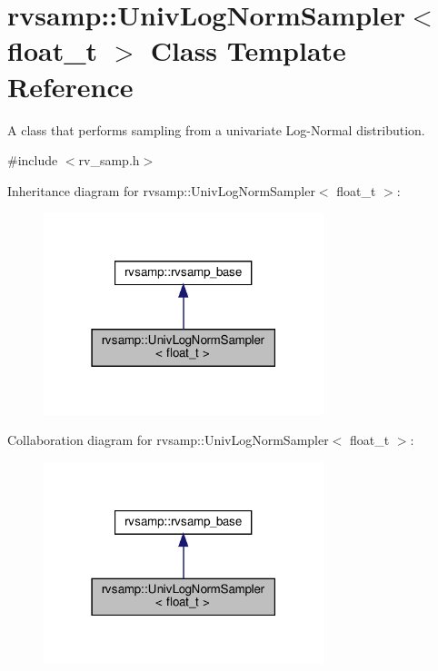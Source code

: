 \hypertarget{classrvsamp_1_1UnivLogNormSampler}{}\section{rvsamp\+:\+:Univ\+Log\+Norm\+Sampler$<$ float\+\_\+t $>$ Class Template Reference}
\label{classrvsamp_1_1UnivLogNormSampler}


A class that performs sampling from a univariate Log-\/\+Normal distribution.  




{\ttfamily \#include $<$rv\+\_\+samp.\+h$>$}



Inheritance diagram for rvsamp\+:\+:Univ\+Log\+Norm\+Sampler$<$ float\+\_\+t $>$\+:
\nopagebreak
\begin{figure}[H]
\begin{center}
\leavevmode
\includegraphics[width=231pt]{classrvsamp_1_1UnivLogNormSampler__inherit__graph}
\end{center}
\end{figure}


Collaboration diagram for rvsamp\+:\+:Univ\+Log\+Norm\+Sampler$<$ float\+\_\+t $>$\+:
\nopagebreak
\begin{figure}[H]
\begin{center}
\leavevmode
\includegraphics[width=231pt]{classrvsamp_1_1UnivLogNormSampler__coll__graph}
\end{center}
\end{figure}
